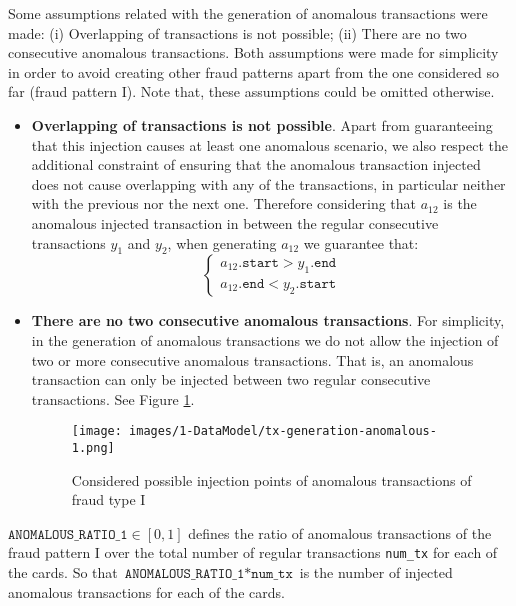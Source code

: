 Some assumptions related with the generation of anomalous transactions were made: (i) Overlapping of transactions is not possible; (ii) There are no two consecutive anomalous transactions. Both assumptions were made for simplicity in order to avoid creating other fraud patterns apart from the one considered so far (fraud pattern I). Note that, these assumptions could be omitted otherwise.

\begin{itemize}
  \item \textbf{Overlapping of transactions is not possible}.
  Apart from guaranteeing that this injection causes at least one anomalous scenario, we also respect the additional constraint of ensuring that the anomalous transaction injected does not cause overlapping with any of the transactions, in particular neither with the previous nor the next one. Therefore considering that $a_{12}$ is the anomalous injected transaction in between the regular consecutive transactions $y_1$ and $y_2$, when generating $a_{12}$ we guarantee that:
  $$
  \begin{cases}
    a_{12}.\texttt{start} > y_{1}.\texttt{end} \\
    a_{12}.\texttt{end} < y_{2}.\texttt{start}
  \end{cases}
  $$
  \item \textbf{There are no two consecutive anomalous transactions}. For simplicity, in the generation of anomalous transactions we do not allow the injection of two or more consecutive anomalous transactions. That is, an anomalous transaction can only be injected between two regular consecutive transactions. See Figure \ref{img:anomalous-type-1-insertion-points}.
  \begin{figure}[H]
    \centering
    \texttt{[image: images/1-DataModel/tx-generation-anomalous-1.png]}
    \caption{Considered possible injection points of anomalous transactions of fraud type I}
    \label{img:anomalous-type-1-insertion-points}
  \end{figure}  
\end{itemize}

$\texttt{ANOMALOUS\_RATIO\_1} \in [0,1]$ defines the ratio of anomalous transactions of the fraud pattern I over the total number of regular transactions \texttt{num\_tx} for each of the cards. So that $\texttt{ANOMALOUS\_RATIO\_1} * \texttt{num\_tx}$ is the number of injected anomalous transactions for each of the cards.\\

